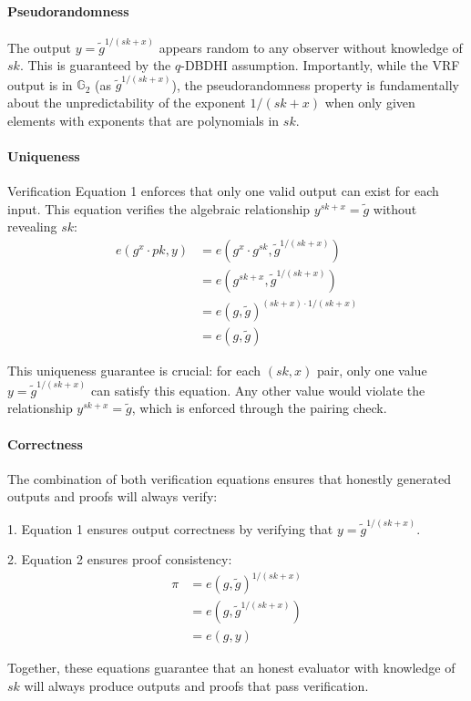 \paragraph{Pseudorandomness}
The output $y = \tilde{g}^{1/(sk + x)}$ appears random to any observer without knowledge of $sk$. This is guaranteed by the $q$-DBDHI assumption. Importantly, while the VRF output is in $\mathbb{G}_2$ (as $\tilde{g}^{1/(sk+x)}$), the pseudorandomness property is fundamentally about the unpredictability of the exponent $1/(sk+x)$ when only given elements with exponents that are polynomials in $sk$.

\paragraph{Uniqueness}
Verification Equation 1 enforces that only one valid output can exist for each input. This equation verifies the algebraic relationship $y^{sk+x} = \tilde{g}$ without revealing $sk$:
\begin{align}
    e(g^{x} \cdot pk, y) &= e(g^{x} \cdot g^{sk}, \tilde{g}^{1/(sk + x)}) \\
    &= e(g^{sk + x}, \tilde{g}^{1/(sk + x)}) \\
    &= e(g, \tilde{g})^{(sk + x) \cdot 1/(sk + x)} \\
    &= e(g, \tilde{g})
\end{align}

This uniqueness guarantee is crucial: for each $(sk,x)$ pair, only one value $y = \tilde{g}^{1/(sk+x)}$ can satisfy this equation. Any other value would violate the relationship $y^{sk+x} = \tilde{g}$, which is enforced through the pairing check.

\paragraph{Correctness}
The combination of both verification equations ensures that honestly generated outputs and proofs will always verify:

1. Equation 1 ensures output correctness by verifying that $y = \tilde{g}^{1/(sk+x)}$.

2. Equation 2 ensures proof consistency:
\begin{align}
    \pi &= e(g, \tilde{g})^{1/(sk + x)} \\
    &= e(g, \tilde{g}^{1/(sk + x)}) \\
    &= e(g, y)
\end{align}

Together, these equations guarantee that an honest evaluator with knowledge of $sk$ will always produce outputs and proofs that pass verification.

